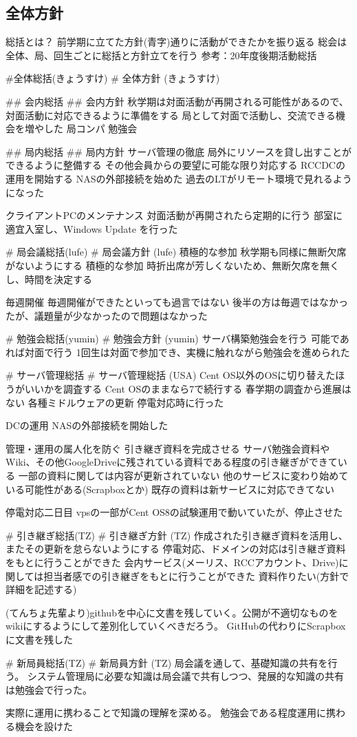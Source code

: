 \subsection*{全体方針}

総括とは？
前学期に立てた方針(青字)通りに活動ができたかを振り返る
総会は全体、局、回生ごとに総括と方針立てを行う
参考：20年度後期活動総括

#全体総括(きょうすけ)
# 全体方針 (きょうすけ)

## 会内総括
## 会内方針
秋学期は対面活動が再開される可能性があるので、対面活動に対応できるように準備をする
局として対面で活動し、交流できる機会を増やした
局コンパ
勉強会

## 局内総括
## 局内方針
サーバ管理の徹底
局外にリソースを貸し出すことができるように整備する
その他会員からの要望に可能な限り対応する
RCCDCの運用を開始する
NASの外部接続を始めた
過去のLTがリモート環境で見れるようになった


クライアントPCのメンテナンス
対面活動が再開されたら定期的に行う
部室に適宜入室し、Windows Update を行った

# 局会議総括(lufe)
# 局会議方針 (lufe)
積極的な参加
秋学期も同様に無断欠席がないようにする
積極的な参加
時折出席が芳しくないため、無断欠席を無くし、時間を決定する

毎週開催
毎週開催ができたといっても過言ではない
後半の方は毎週ではなかったが、議題量が少なかったので問題はなかった

# 勉強会総括(yumin)
# 勉強会方針 (yumin)
サーバ構築勉強会を行う
可能であれば対面で行う
1回生は対面で参加でき、実機に触れながら勉強会を進められた

# サーバ管理総括
# サーバ管理総括 (USA)
Cent OS以外のOSに切り替えたほうがいいかを調査する
Cent OSのままなら7で続行する
春学期の調査から進展はない
各種ミドルウェアの更新
停電対応時に行った

DCの運用
NASの外部接続を開始した

管理・運用の属人化を防ぐ
引き継ぎ資料を完成させる
サーバ勉強会資料やWiki、その他GoogleDriveに残されている資料である程度の引き継ぎができている
一部の資料に関しては内容が更新されていない
他のサービスに変わり始めている可能性がある(Scrapboxとか)
既存の資料は新サービスに対応できてない

停電対応二日目
vpsの一部がCent OS8の試験運用で動いていたが、停止させた

# 引き継ぎ総括(TZ)
# 引き継ぎ方針 (TZ)
作成された引き継ぎ資料を活用し、またその更新を怠らないようにする
停電対応、ドメインの対応は引き継ぎ資料をもとに行うことができた
会内サービス(メーリス、RCCアカウント、Drive)に関しては担当者感での引き継ぎをもとに行うことができた
資料作りたい(方針で詳細を記述する)

(てんちょ先輩より)githubを中心に文書を残していく。公開が不適切なものをwikiにするようにして差別化していくべきだろう。
GitHubの代わりにScrapboxに文書を残した

# 新局員総括(TZ)
# 新局員方針 (TZ)
局会議を通して、基礎知識の共有を行う。
システム管理局に必要な知識は局会議で共有しつつ、発展的な知識の共有は勉強会で行った。

実際に運用に携わることで知識の理解を深める。
勉強会である程度運用に携わる機会を設けた

